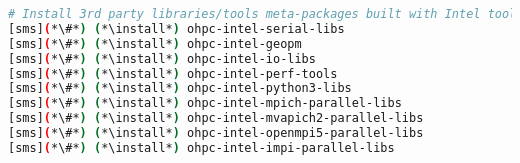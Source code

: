 
\begin{lstlisting}[language=bash,keywords={},upquote=true,keepspaces]
# Install 3rd party libraries/tools meta-packages built with Intel toolchain
[sms](*\#*) (*\install*) ohpc-intel-serial-libs
[sms](*\#*) (*\install*) ohpc-intel-geopm
[sms](*\#*) (*\install*) ohpc-intel-io-libs
[sms](*\#*) (*\install*) ohpc-intel-perf-tools
[sms](*\#*) (*\install*) ohpc-intel-python3-libs
[sms](*\#*) (*\install*) ohpc-intel-mpich-parallel-libs
[sms](*\#*) (*\install*) ohpc-intel-mvapich2-parallel-libs
[sms](*\#*) (*\install*) ohpc-intel-openmpi5-parallel-libs
[sms](*\#*) (*\install*) ohpc-intel-impi-parallel-libs
\end{lstlisting}

